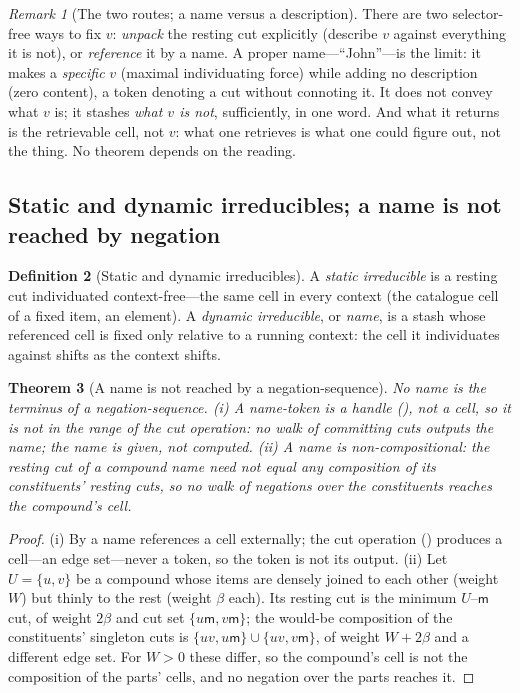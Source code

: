 \documentclass[twocolumn,11pt,a4paper]{article}
\theoremstyle{sup}
\newtheorem{theorem}{Theorem}[section]
\theoremstyle{definition}
\newtheorem{definition}[theorem]{Definition}
\theoremstyle{remark}
\newtheorem{remark}[theorem]{Remark}
\newcommand{\med}{\mathsf{m}}
\newcommand{\flo}{\beta}
\begin{document}
\begin{remark}[The two routes; a name versus a description]
\label{rem:two-routes}
There are two selector-free ways to fix $v$: \emph{unpack} the resting cut
explicitly (describe $v$ against everything it is not), or \emph{reference} it by
a name. A proper name---``John''---is the limit: it makes a \emph{specific} $v$
(maximal individuating force) while adding no description (zero content), a token
denoting a cut without connoting it. It does not convey what $v$ is; it stashes
\emph{what $v$ is not}, sufficiently, in one word. And what it returns is the
retrievable cell, not $v$: what one retrieves is what one could figure out, not
the thing. No theorem depends on the reading.
\end{remark}

\subsection{Static and dynamic irreducibles; a name is not reached by negation}

\begin{definition}[Static and dynamic irreducibles]
\label{def:static-dynamic}
A \emph{static irreducible} is a resting cut individuated context-free---the same
cell in every context (the catalogue cell of a fixed item, an element). A
\emph{dynamic irreducible}, or \emph{name}, is a stash whose referenced cell is
fixed only relative to a running context: the cell it individuates against shifts
as the context shifts.
\end{definition}

\begin{theorem}[A name is not reached by a negation-sequence]
\label{thm:non-derivable}
No name is the terminus of a negation-sequence. \textup{(i)} A name-token is a
handle (), not a cell, so it is not in the range of the cut
operation: no walk of committing cuts outputs the name; the name is \emph{given},
not computed. \textup{(ii)} A name is \emph{non-compositional}: the resting cut of
a compound name need not equal any composition of its constituents' resting cuts,
so no walk of negations over the constituents reaches the compound's cell.
\end{theorem}

\begin{proof}
(i) By  a name references a cell externally; the cut operation
() produces a cell---an edge set---never a token, so the token
is not its output. (ii) Let $U=\{u,v\}$ be a compound whose items are densely
joined to each other (weight $W$) but thinly to the rest (weight $\flo$ each).
Its resting cut is the minimum $U$--$\med$ cut, of weight $2\flo$ and cut set
$\{u\med,v\med\}$; the would-be composition of the constituents' singleton cuts
is $\{uv,u\med\}\cup\{uv,v\med\}$, of weight $W+2\flo$ and a different edge set.
For $W>0$ these differ, so the compound's cell is not the composition of the
parts' cells, and no negation over the parts reaches it.
\end{proof}
\end{document}
